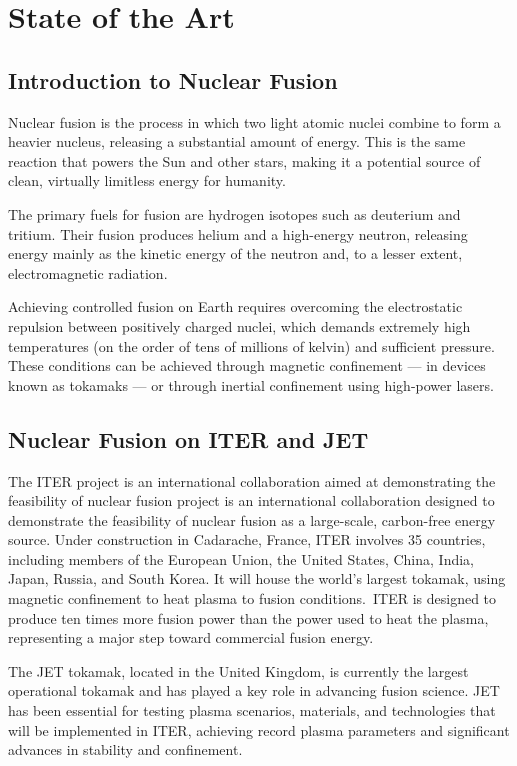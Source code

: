 \chapter{State of the Art} \label{sec:cap2}

\section{Introduction to Nuclear Fusion}

Nuclear fusion is the process in which two light atomic nuclei combine to form a heavier nucleus, releasing a substantial amount of energy. This is the same reaction that powers the Sun and other stars, making it a potential source of clean, virtually limitless energy for humanity.

The primary fuels for fusion are hydrogen isotopes such as deuterium and tritium. Their fusion produces helium and a high-energy neutron, releasing energy mainly as the kinetic energy of the neutron and, to a lesser extent, electromagnetic radiation.

Achieving controlled fusion on Earth requires overcoming the electrostatic repulsion between positively charged nuclei, which demands extremely high temperatures (on the order of tens of millions of kelvin) and sufficient pressure. These conditions can be achieved through magnetic confinement — in devices known as tokamaks — or through inertial confinement using high-power lasers.


\section{Nuclear Fusion on \acs{ITER} and \acs{JET}}

The \ac{ITER} project is an international collaboration aimed at demonstrating the feasibility of nuclear fusion  project is an international collaboration designed to demonstrate the feasibility of nuclear fusion as a large-scale, carbon-free energy source. Under construction in Cadarache, France, ITER involves 35 countries, including members of the European Union, the United States, China, India, Japan, Russia, and South Korea. It will house the world's largest tokamak, using magnetic confinement to heat plasma to fusion conditions.\ \ac{ITER} is designed to produce ten times more fusion power than the power used to heat the plasma, representing a major step toward commercial fusion energy.

The \ac{JET} tokamak, located in the United Kingdom, is currently the largest operational tokamak and has played a key role in advancing fusion science. \ac{JET} has been essential for testing plasma scenarios, materials, and technologies that will be implemented in \ac{ITER}, achieving record plasma parameters and significant advances in stability and confinement.

